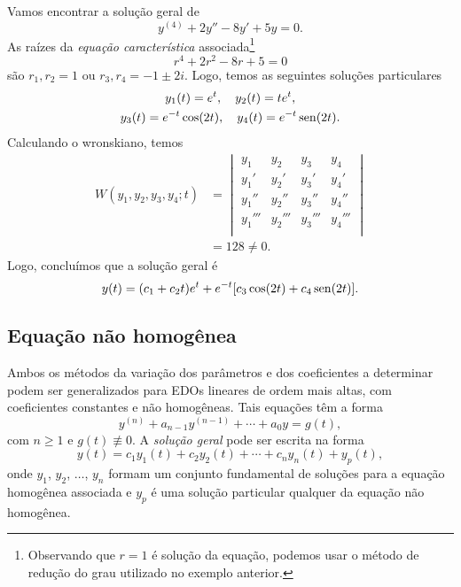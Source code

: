 \begin{ex}
  Vamos encontrar a solução geral de
  \begin{equation}
    y^{(4)} + 2y'' - 8y' + 5y = 0.
  \end{equation}
  As raízes da \emph{equação característica} associada\footnote{Observando que $r=1$ é solução da equação, podemos usar o método de redução do grau utilizado no exemplo anterior.}
  \begin{equation}
    r^4 + 2r^2 - 8r + 5 = 0
  \end{equation}
  são $r_1, r_2 = 1$ ou $r_3, r_4 = -1 \pm 2i$. Logo, temos as seguintes soluções particulares
  \begin{gather}
    y_1(t) = e^t,\quad y_2(t) = te^t, \\
    y_3(t) = e^{-t}\cos(2t),\quad y_4(t) = e^{-t}\operatorname{sen}(2t).
  \end{gather}
  Calculando o wronskiano, temos
  \begin{align}
    W(y_1,y_2,y_3,y_4;t) &=
                           \begin{vmatrix}
                             y_1 & y_2 & y_3 & y_4 \\
                             y_1' & y_2' & y_3' & y_4' \\
                             y_1'' & y_2'' & y_3'' & y_4'' \\
                             y_1''' & y_2''' & y_3''' & y_4''' \\
                           \end{vmatrix}\\
                         &= 128 \neq 0.
  \end{align}
  Logo, concluímos que a solução geral é
  \begin{equation}
    y(t) = (c_1 + c_2t)e^t + e^{-t}[c_3\cos(2t) + c_4\operatorname{sen}(2t)].
  \end{equation}
\end{ex}

\subsection{Equação não homogênea}

Ambos os métodos da variação dos parâmetros e dos coeficientes a determinar podem ser generalizados para EDOs lineares de ordem mais altas, com coeficientes constantes e não homogêneas. Tais equações têm a forma
\begin{equation}
  y^{(n)} + a_{n-1}y^{(n-1)} + \cdots + a_0y = g(t),
\end{equation}
com $n\geq 1$ e $g(t)\not\equiv 0$. A \emph{solução geral} pode ser escrita na forma
\begin{equation}
  y(t) = c_1y_1(t) + c_2y_2(t) + \cdots + c_ny_n(t) + y_p(t),
\end{equation}
onde $y_1$, $y_2$, $\dotsc$, $y_n$ formam um conjunto fundamental de soluções para a equação homogênea associada e $y_p$ é uma solução particular qualquer da equação não homogênea.

